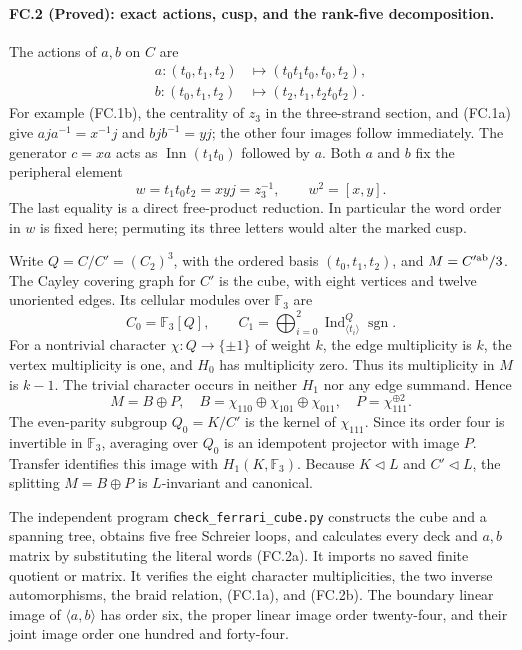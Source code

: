 \paragraph{FC.2 (Proved): exact actions, cusp, and the rank-five decomposition.}
The actions of $a,b$ on $C$ are
\[
\begin{split}
 a:(t_0,t_1,t_2)&\mapsto(t_0t_1t_0,t_0,t_2),\\
 b:(t_0,t_1,t_2)&\mapsto(t_2,t_1,t_2t_0t_2).
\end{split}
 \tag{FC.2a}
\]
For example (FC.1b), the centrality of $z_3$ in the
three-strand section, and (FC.1a) give
$aja^{-1}=x^{-1}j$ and $bjb^{-1}=yj$; the other four
images follow immediately. The generator $c=xa$ acts as
$\operatorname{Inn}(t_1t_0)$ followed by $a$.
Both $a$ and $b$ fix the peripheral element
\[
 w=t_1t_0t_2=xyj=z_3^{-1},\qquad w^2=[x,y].
 \tag{FC.2b}
\]
The last equality is a direct free-product reduction. In particular
the word order in $w$ is fixed here; permuting its three letters
would alter the marked cusp.

Write $Q=C/C'=(C_2)^3$, with the ordered basis $(t_0,t_1,t_2)$,
and $M=C'^{\rm ab}/3$. The Cayley covering graph for $C'$
is the cube, with eight vertices and twelve unoriented edges.
Its cellular modules over $\mathbb F_3$ are
\[
 C_0=\mathbb F_3[Q],\qquad
 C_1=\bigoplus_{i=0}^2
    \operatorname{Ind}_{\langle t_i\rangle}^{Q}\operatorname{sgn}.
\]
For a nontrivial character $\chi:Q\to\{\pm1\}$ of weight
$k$, the edge multiplicity is $k$, the vertex multiplicity is one,
and $H_0$ has multiplicity zero. Thus its multiplicity in $M$
is $k-1$. The trivial character occurs in neither $H_1$ nor any
edge summand. Hence
\[
 M=B\oplus P,\quad
 B=\chi_{110}\oplus\chi_{101}\oplus\chi_{011},\quad
 P=\chi_{111}^{\oplus2}.
 \tag{FC.2c}
\]
The even-parity subgroup $Q_0=K/C'$ is the kernel of
$\chi_{111}$. Since its order four is invertible in
$\mathbb F_3$, averaging over $Q_0$ is an idempotent projector
with image $P$. Transfer identifies this image with
$H_1(K,\mathbb F_3)$. Because $K\triangleleft L$ and
$C'\triangleleft L$, the splitting $M=B\oplus P$ is
$L$-invariant and canonical.

The independent program \texttt{check\_ferrari\_cube.py}
constructs the cube and a spanning tree, obtains five free
Schreier loops, and calculates every deck and $a,b$ matrix by
substituting the literal words (FC.2a). It imports no saved finite
quotient or matrix. It verifies the eight character multiplicities,
the two inverse automorphisms, the braid relation, (FC.1a), and
(FC.2b). The boundary linear image of $\langle a,b\rangle$
has order six, the proper linear image order twenty-four, and
their joint image order one hundred and forty-four.

